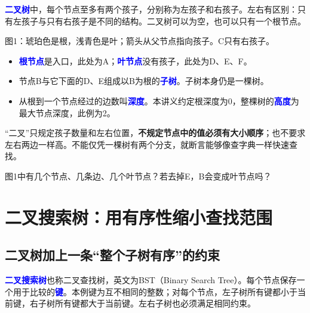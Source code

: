 \documentclass[UTF8,a4paper,11pt,fontset=fandol]{ctexart}
\numberwithin{equation}{subsection}
\newcommand{\term}[1]{\textcolor{Blue}{\textbf{#1}}}
\begin{document}
\term{二叉树}中，每个节点至多有两个孩子，分别称为左孩子和右孩子。左右有区别：只有左孩子与只有右孩子是不同的结构。二叉树可以为空，也可以只有一个根节点。
\begin{center}

{\small 图1：琥珀色是根，浅青色是叶；箭头从父节点指向孩子。C只有右孩子。}
\end{center}
\begin{itemize}
\item \term{根节点}是入口，此处为A；\term{叶节点}没有孩子，此处为D、E、F。
\item 节点B与它下面的D、E组成以B为根的\term{子树}。子树本身仍是一棵树。
\item 从根到一个节点经过的边数叫\term{深度}。本讲义约定根深度为0，整棵树的\term{高度}为最大节点深度，此例为2。
\end{itemize}
\begin{pitfallbox}
“二叉”只规定孩子数量和左右位置，\textbf{不规定节点中的值必须有大小顺序}；也不要求左右两边一样高。不能仅凭一棵树有两个分支，就断言能够像查字典一样快速查找。
\end{pitfallbox}
\begin{questionbox}[思考题1]
图1中有几个节点、几条边、几个叶节点？若去掉E，B会变成叶节点吗？
\end{questionbox}

\clearpage
\section{二叉搜索树：用有序性缩小查找范围}
\subsection{二叉树加上一条“整个子树有序”的约束}
\term{二叉搜索树}也称二叉查找树，英文为BST（Binary Search Tree）。每个节点保存一个用于比较的\term{键}。本例键为互不相同的整数；对每个节点，左子树所有键都小于当前键，右子树所有键都大于当前键。左右子树也必须满足相同约束。
\end{document}

